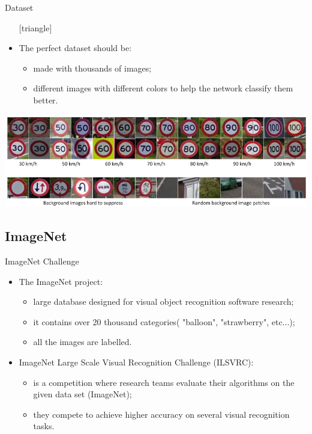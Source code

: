 \documentclass{beamer}
\begin{document}
\begin{frame}{Dataset}
	\begin{itemize}
		\setlength\itemsep{1em}
		[triangle]
		\item 
			The perfect dataset should be:
			\begin{itemize}
				[circle]
				\item 
					made with thousands of images;
				\item 
					different images with different colors to help the network classify them better.
			\end{itemize}
	\end{itemize}
	\begin{center}
		\includegraphics[scale=0.35]{datasets}
	\end{center}
\end{frame}

\subsection{ImageNet}
\begin{frame}{ImageNet Challenge}
	\begin{itemize}
		\setlength\itemsep{1em}
		[triangle]
		\item 
			The ImageNet project:
			\begin{itemize}
				[circle]
				\item 
					large database designed for visual object recognition software research;
				\item 
					it contains over 20 thousand categories( "balloon", "strawberry", etc...);
				\item
					all the images are labelled.
			\end{itemize}
		\item 
			ImageNet Large Scale Visual Recognition Challenge (ILSVRC):
			\begin{itemize}
				[circle]
				\item 
					is a competition where research teams evaluate their algorithms on the given data								set (ImageNet);
				\item 
					they compete to achieve higher accuracy on several visual recognition tasks.
			\end{itemize}
	\end{itemize}
\end{frame}
\end{document}
